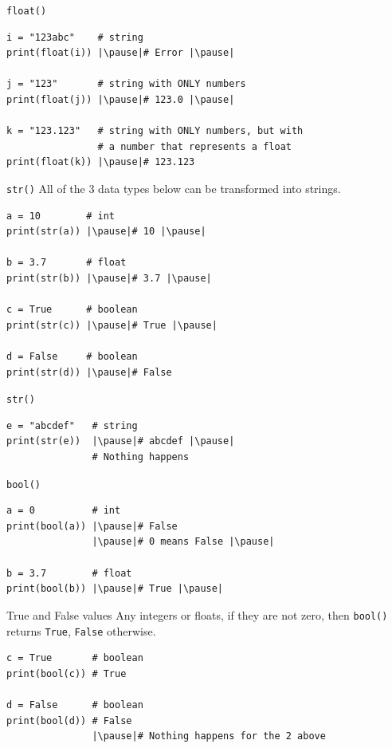 \documentclass[dvipsnames, svgnames, x11names, handout]{beamer}
\begin{document}
\begin{frame}[fragile]{\texttt{float()}}
\begin{verbatim}
i = "123abc"    # string
print(float(i)) |\pause|# Error |\pause|
 
j = "123"       # string with ONLY numbers
print(float(j)) |\pause|# 123.0 |\pause|

k = "123.123"   # string with ONLY numbers, but with 
                # a number that represents a float
print(float(k)) |\pause|# 123.123
\end{verbatim}
\end{frame}

\begin{frame}[fragile]{\texttt{str()}}
All of the 3 data types below can be transformed into strings. \pause
\begin{verbatim} 
a = 10        # int
print(str(a)) |\pause|# 10 |\pause|

b = 3.7       # float
print(str(b)) |\pause|# 3.7 |\pause|

c = True      # boolean
print(str(c)) |\pause|# True |\pause|

d = False     # boolean
print(str(d)) |\pause|# False
\end{verbatim}
\end{frame}

\begin{frame}[fragile]{\texttt{str()}}
\begin{verbatim} 
e = "abcdef"   # string
print(str(e))  |\pause|# abcdef |\pause|
               # Nothing happens
\end{verbatim}
\end{frame}

\begin{frame}[fragile]{\texttt{bool()}}
\begin{verbatim} 
a = 0          # int
print(bool(a)) |\pause|# False
               |\pause|# 0 means False |\pause|

b = 3.7        # float
print(bool(b)) |\pause|# True |\pause|
\end{verbatim}

\begin{block}{True and False values}
	Any integers or floats, if they are not zero, then \texttt{bool()} returns \texttt{True}, \texttt{False} otherwise.
\end{block}

\pause

\begin{verbatim} 
c = True       # boolean
print(bool(c)) # True

d = False      # boolean
print(bool(d)) # False
               |\pause|# Nothing happens for the 2 above
\end{verbatim}
\end{frame}
\end{document}
